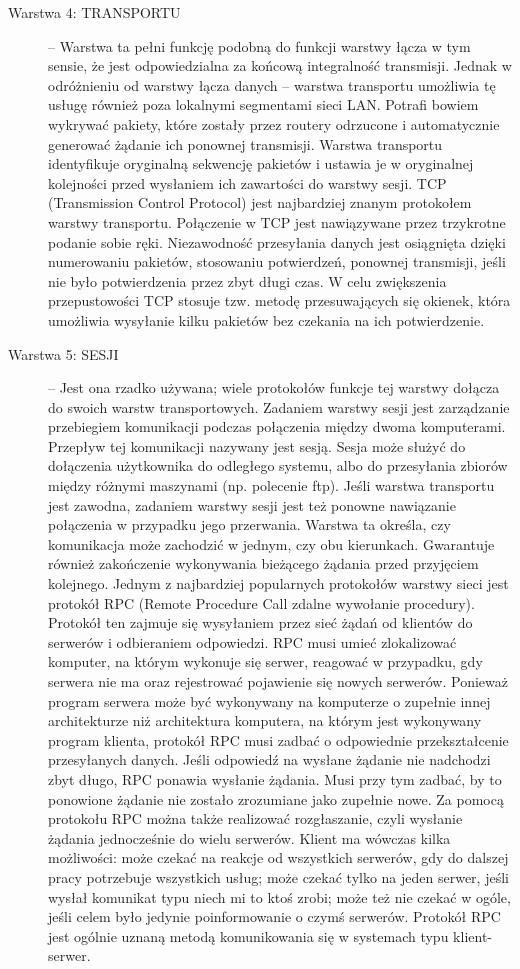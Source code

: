 \documentclass[a4paper,11pt]{article}
\begin{document}
\begin{description}
\item [Warstwa 4: TRANSPORTU] -- Warstwa ta pełni funkcję podobną do funkcji warstwy łącza w tym sensie, że jest odpowiedzialna za końcową integralność transmisji. Jednak w odróżnieniu od warstwy łącza danych -- warstwa transportu umożliwia tę usługę również poza lokalnymi segmentami sieci LAN. Potrafi bowiem wykrywać pakiety, które zostały przez routery odrzucone i automatycznie generować żądanie ich ponownej transmisji. Warstwa transportu identyfikuje oryginalną sekwencję pakietów i ustawia je w oryginalnej kolejności przed wysłaniem ich zawartości do warstwy sesji. TCP (Transmission Control Protocol) jest najbardziej znanym protokołem warstwy transportu. Połączenie w TCP jest nawiązywane przez trzykrotne podanie sobie ręki. Niezawodność przesyłania danych jest osiągnięta dzięki numerowaniu pakietów, stosowaniu potwierdzeń, ponownej transmisji, jeśli nie było potwierdzenia przez zbyt długi czas. W celu zwiększenia przepustowości TCP stosuje tzw. metodę przesuwających się okienek, która umożliwia wysyłanie kilku pakietów bez czekania na ich potwierdzenie. 
\item [Warstwa 5: SESJI] -- Jest ona rzadko używana; wiele protokołów funkcje tej warstwy dołącza do swoich warstw transportowych. Zadaniem warstwy sesji jest zarządzanie przebiegiem komunikacji podczas połączenia między dwoma komputerami. Przepływ tej komunikacji nazywany jest sesją. Sesja może służyć do dołączenia użytkownika do odległego systemu, albo do przesyłania zbiorów między różnymi maszynami (np. polecenie ftp). Jeśli warstwa transportu jest zawodna, zadaniem warstwy sesji jest też ponowne nawiązanie połączenia w przypadku jego przerwania. Warstwa ta określa, czy komunikacja może zachodzić w jednym, czy obu kierunkach. Gwarantuje również zakończenie wykonywania bieżącego żądania przed przyjęciem kolejnego. Jednym z najbardziej popularnych protokołów warstwy sieci jest protokół RPC (Remote Procedure Call  zdalne wywołanie procedury). Protokół ten zajmuje się wysyłaniem przez sieć żądań od klientów do serwerów i odbieraniem odpowiedzi. RPC musi umieć zlokalizować komputer, na którym wykonuje się serwer, reagować w przypadku, gdy serwera nie ma oraz rejestrować pojawienie się nowych serwerów. Ponieważ program serwera może być wykonywany na komputerze o zupełnie innej architekturze niż architektura komputera, na którym jest wykonywany program klienta, protokół RPC musi zadbać o odpowiednie przekształcenie przesyłanych danych.  Jeśli odpowiedź na wysłane żądanie nie nadchodzi zbyt długo, RPC ponawia wysłanie żądania. Musi przy tym zadbać, by to ponowione żądanie nie zostało zrozumiane jako zupełnie nowe. Za pomocą protokołu RPC można także realizować rozgłaszanie, czyli wysłanie żądania jednocześnie do wielu serwerów. Klient ma wówczas kilka możliwości: może czekać na reakcje od wszystkich serwerów, gdy do dalszej pracy potrzebuje wszystkich usług; może czekać tylko na jeden serwer, jeśli wysłał komunikat typu niech mi to ktoś zrobi; może też nie czekać w ogóle, jeśli celem było jedynie poinformowanie o czymś serwerów. Protokół RPC jest ogólnie uznaną metodą komunikowania się w systemach typu klient-serwer.


\end{description}
\end{document}
